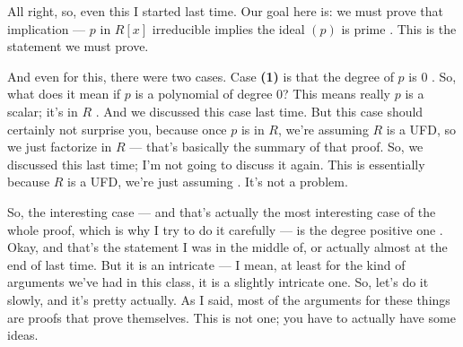 \begin{hidden}
\end{hidden}

\begin{speech}[00:13:52 - 00:15:33]
All right, so, even this I started last time. Our goal here is: we must prove that implication --- $p$ in $R[x]$ irreducible implies the ideal $(p)$ is prime . This is the statement we must prove.

And even for this, there were two cases. Case \textbf{(1)} is that the degree of $p$ is $0$ . So, what does it mean if $p$ is a polynomial of degree $0$? This means really $p$ is a scalar; it's in $R$ . And we discussed this case last time. But this case should certainly not surprise you, because once $p$ is in $R$, we're assuming $R$ is a UFD, so we just factorize in $R$ --- that's basically the summary of that proof. So, we discussed this last time; I'm not going to discuss it again. This is essentially because $R$ is a UFD, we're just assuming . It's not a problem.

So, the interesting case --- and that's actually the most interesting case of the whole proof, which is why I try to do it carefully --- is the degree positive one . Okay, and that's the statement I was in the middle of, or actually almost at the end of last time. But it is an intricate --- I mean, at least for the kind of arguments we've had in this class, it is a slightly intricate one. So, let's do it slowly, and it's pretty actually. As I said, most of the arguments for these things are proofs that prove themselves. This is not one; you have to actually have some ideas.
\end{speech}

